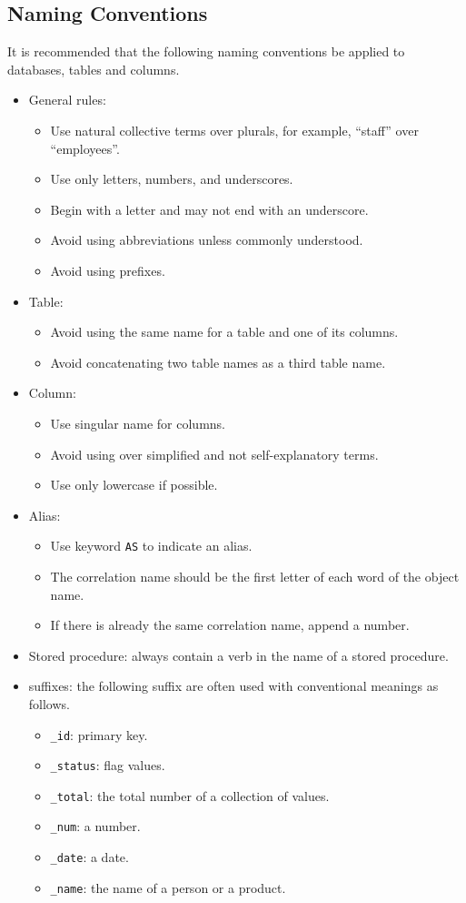 \subsection{Naming Conventions} \label{ch:db:subsec:tables}

It is recommended that the following naming conventions be applied to databases, tables and columns.
\begin{itemize}
\item General rules:
\begin{itemize}
\item Use natural collective terms over plurals, for example, ``staff'' over ``employees''.
\item Use only letters, numbers, and underscores.
\item Begin with a letter and may not end with an underscore.
\item Avoid using abbreviations unless commonly understood.
\item Avoid using prefixes.
\end{itemize}
\item Table:
\begin{itemize}
	\item Avoid using the same name for a table and one of its columns.
	\item Avoid concatenating two table names as a third table name.
\end{itemize}
\item Column:
\begin{itemize}
	\item Use singular name for columns.
	\item Avoid using over simplified and not self-explanatory terms.
	\item Use only lowercase if possible.
\end{itemize}
\item Alias:
\begin{itemize}
	\item Use keyword \verb|AS| to indicate an alias.
	\item The correlation name should be the first letter of each word of the object name.
	\item If there is already the same correlation name, append a number.
\end{itemize}
\item Stored procedure: always contain a verb in the name of a stored procedure.
\item suffixes: the following suffix are often used with conventional meanings as follows.
\begin{itemize}
	\item \verb|_id|: primary key.
	\item \verb|_status|: flag values.
	\item \verb|_total|: the total number of a collection of values.
	\item \verb|_num|: a number.
	\item \verb|_date|: a date.
	\item \verb|_name|: the name of a person or a product.
\end{itemize}
\end{itemize}

